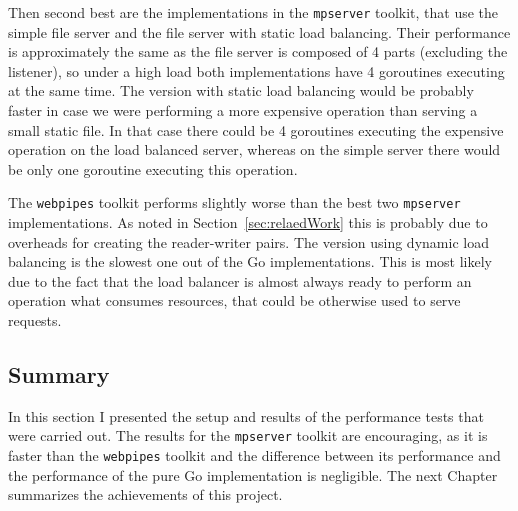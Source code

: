 Then second best are the implementations in the \texttt{mpserver}
toolkit, that use the simple file server and the file server with static load 
balancing. Their performance is approximately the same as the file server is composed of 
4 parts (excluding the listener), so under a high load both implementations 
have 4 goroutines executing at the same time. The version with static load balancing
would be probably faster in case we were performing a more expensive operation than serving
a small static file. In that case there could be 4 goroutines executing the expensive
operation on the load balanced server, whereas on the simple server there would be only one goroutine 
executing this operation.

The \texttt{webpipes} toolkit performs slightly worse than the best two
\texttt{mpserver} implementations. As noted in Section~\ref{sec:relaedWork} this is probably
due to overheads for creating the reader-writer pairs.
The version using dynamic load balancing is the slowest one out of the Go implementations.
This is most likely due to the fact that the load balancer is almost always ready to perform
an operation what consumes resources, that could be otherwise used to serve requests.

\subsection{Summary}
In this section I presented the setup and results of the performance tests that were carried out.
The results for the \texttt{mpserver} toolkit are encouraging, as it is faster than
the \texttt{webpipes} toolkit and the difference between its performance and the performance
of the pure Go implementation is negligible. The next Chapter summarizes the achievements 
of this project.